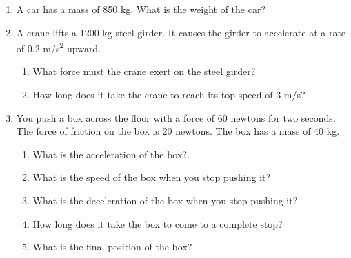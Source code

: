 \documentclass[letterpaper, 12pt]{article}
\begin{document}
\begin{enumerate}
\item A car has a mass of 850 kg.  What is the weight of the car?
\vspace{0.4in}


\item A crane lifts a 1200 kg steel girder.  It causes the girder to accelerate at a rate of 0.2 m/s\textsuperscript{2} upward. 
\begin{enumerate}
	\item What force must the crane exert on the steel girder?
	\vspace{0.4in}
	\item How long does it take the crane to reach its top speed of 3 m/s?

\end{enumerate}

\pagebreak


\item You push a box across the floor with a force of 60 newtons for two seconds.  The force of friction on the box is 20 newtons.  The box has a mass of 40 kg.  
\begin{enumerate}
	\item What is the acceleration of the box?
	\vspace{0.4in}
	\item What is the speed of the box when you stop pushing it?
	\vspace{0.4in}
	\item What is the deceleration of the box when you stop pushing it?
	\vspace{0.4in}
	\item How long does it take the box to come to a complete stop?
	\vspace{0.4in}
	\item What is the final position of the box?
	\vspace{0.4in}
\end{enumerate}



\end{enumerate}
 
\end{document}
